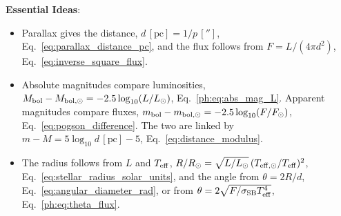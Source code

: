 \textbf{Essential Ideas}:
\begin{itemize}
	\item Parallax gives the distance, $d\,[\mathrm{pc}]=1/p\,['']$, Eq.~\eqref{eq:parallax_distance_pc}, and the flux follows from $F = L/(4\pi d^2)$, Eq.~\eqref{eq:inverse_square_flux}.
	\item Absolute magnitudes compare luminosities, $M_{\rm bol}-M_{\rm bol,\odot}=-2.5\log_{10}(L/L_\odot)$, Eq.~\eqref{ph:eq:abs_mag_L}. Apparent magnitudes compare fluxes, $m_{\rm bol}-m_{\rm bol,\odot}=-2.5\log_{10}(F/F_\odot)$, Eq.~\eqref{eq:pogson_difference}. The two are linked by $m-M=5\log_{10}d\,[\mathrm{pc}]-5$, Eq.~\eqref{eq:distance_modulus}.
	\item The radius follows from $L$ and $T_{\rm eff}$, $R/R_\odot = \sqrt{L/L_\odot}\,(T_{\rm eff,\odot}/T_{\rm eff})^2$, Eq.~\eqref{eq:stellar_radius_solar_units}, and the angle from $\theta = 2R/d$, Eq.~\eqref{eq:angular_diameter_rad}, or from $\theta=2\sqrt{F/\sigma_{\rm SB}T_{\rm eff}^4}$, Eq.~\eqref{ph:eq:theta_flux}.
\end{itemize}

